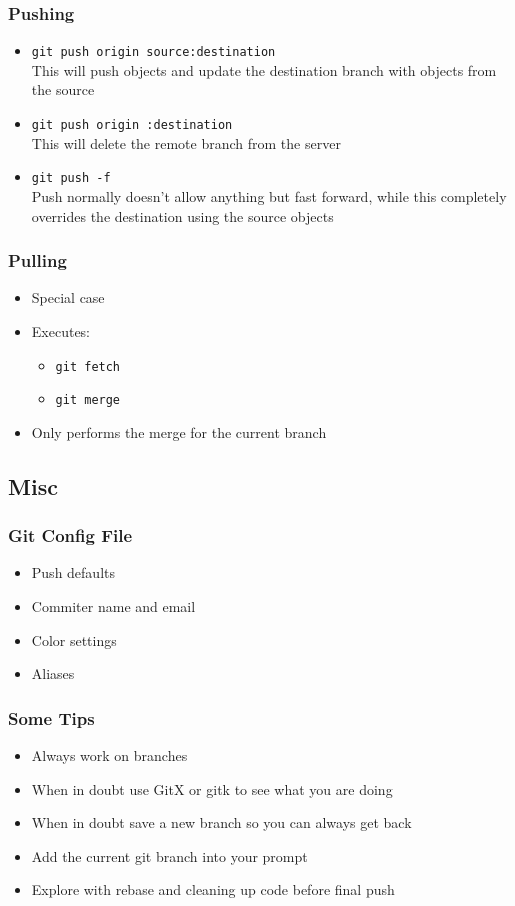 \begin{frame}
  \frametitle{Pushing}
  \begin{itemize}
    \item \texttt{git push origin source:destination} \\ This will push objects
      and update the destination branch with objects from the source
      \pause
    \item \texttt{git push origin :destination} \\ This will delete the remote
      branch from the server
      \pause
    \item \texttt{git push -f} \\ Push normally doesn't allow anything but fast
      forward, while this completely overrides the destination using the source
      objects
  \end{itemize}
\end{frame}

\begin{frame}
  \frametitle{Pulling}
  \begin{itemize}
  \item Special case
  \item Executes:
    \begin{itemize}
    \item \texttt{git fetch}
    \item \texttt{git merge}
    \end{itemize}
  \item Only performs the merge for the current branch
  \end{itemize}
\end{frame}

\subsection{Misc}

\begin{frame}
  \frametitle{Git Config File}
  \begin{itemize}
    \item Push defaults
    \item Commiter name and email
    \item Color settings
    \item Aliases
  \end{itemize}
\end{frame}

\begin{frame}
  \frametitle{Some Tips}
  \begin{itemize}
    \item Always work on branches
      \pause
    \item When in doubt use GitX or gitk to see what you are doing
      \pause
    \item When in doubt save a new branch so you can always get back
      \pause
    \item Add the current git branch into your prompt
      \pause
    \item Explore with rebase and cleaning up code before final push
  \end{itemize}
\end{frame}


